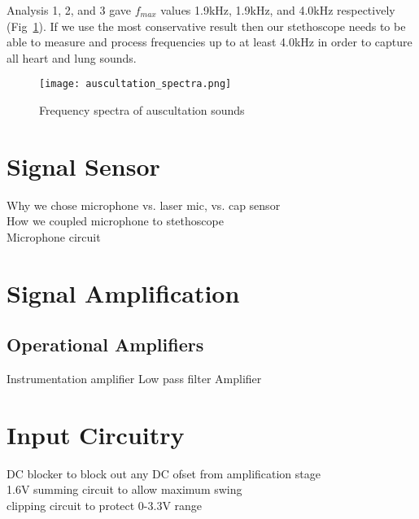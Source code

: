 Analysis 1, 2, and 3 gave $f_{max}$ values 1.9kHz, 1.9kHz, and 4.0kHz respectively (Fig~\ref{fig:ausc_spectra}). If we use the most conservative result then our stethoscope needs to be able to measure and process frequencies up to at least 4.0kHz in order to capture all heart and lung sounds.

\begin{figure}[htb]
	\centering
		\texttt{[image: auscultation\_spectra.png]}
	\caption{Frequency spectra of auscultation sounds}
	\label{fig:ausc_spectra}
\end{figure}

\section{Signal Sensor}
Why we chose microphone vs. laser mic, vs. cap sensor \\
How we coupled microphone to stethoscope \\
Microphone circuit

\section{Signal Amplification}
\subsection{Operational Amplifiers}

Instrumentation amplifier \cite{Franco2015}
Low pass filter \cite[p.~279]{Horowitz1989}
Amplifier

\section{Input Circuitry}
DC blocker to block out any DC ofset from amplification stage\\
1.6V summing circuit to allow maximum swing\\
clipping circuit to protect 0-3.3V range \\


